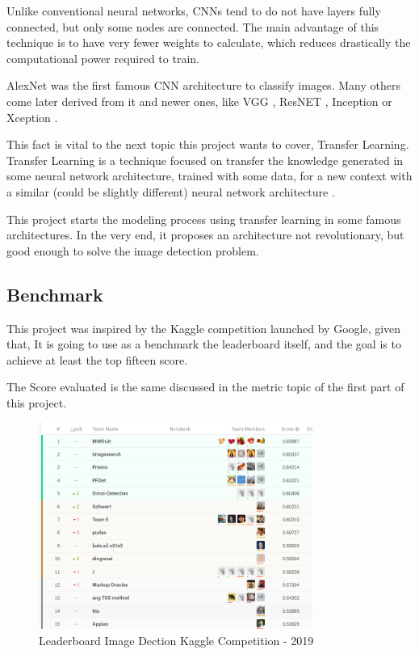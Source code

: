 \documentclass[11pt, a4paper, onecolumn]{article}
\begin{document}
Unlike conventional neural networks, CNNs tend to do not have layers fully connected, but only some nodes are connected. The main advantage of this technique is to have very fewer weights to calculate, which reduces drastically the computational power required to train.

AlexNet \cite{AlexNet} was the first famous CNN architecture to classify images. Many others come later derived from it and newer ones, like VGG \cite{vgg}, ResNET \cite{resnet}, Inception \cite{inception} or Xception \cite{xception}.

This fact is vital to the next topic this project wants to cover, Transfer Learning. Transfer Learning is a technique focused on transfer the knowledge generated in some neural network architecture, trained with some data, for a new context with a similar (could be slightly different) neural network architecture \cite{transfer-learning:1} \cite{transfer-learning:2}.

This project starts the modeling process using transfer learning in some famous architectures. In the very end, it proposes an architecture not revolutionary, but good enough to solve the image detection problem.

\subsection{Benchmark}

This project was inspired by the Kaggle competition launched by Google, given that, It is going to use as a benchmark the leaderboard itself, \cite{leaderboard} and the goal is to achieve at least the top fifteen score.

The Score evaluated is the same discussed in the metric topic of the first part of this project. 

\begin{figure}[!ht]
	\centering
	\includegraphics[width=0.8\textwidth]{leaderboard.png}
	\caption{\scriptsize Leaderboard Image Dection Kaggle Competition - 2019}
\end{figure}
\end{document}
